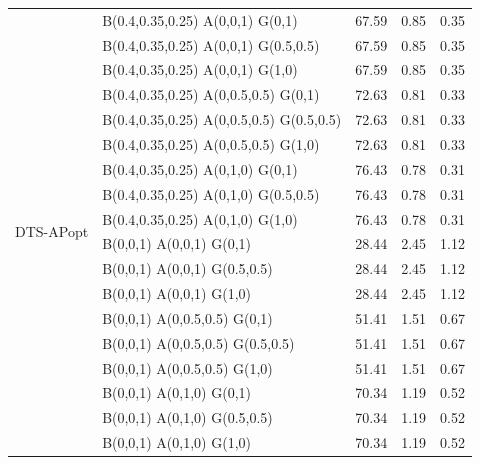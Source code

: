 \documentclass[12pt]{article}
\begin{document}
\begin{longtable}{llccc}
\multirow{18}{*}{DTS-APopt}
& B(0.4,0.35,0.25) A(0,0,1) G(0,1) & 67.59 & 0.85 & 0.35 \\
& B(0.4,0.35,0.25) A(0,0,1) G(0.5,0.5) & 67.59 & 0.85 & 0.35 \\
& B(0.4,0.35,0.25) A(0,0,1) G(1,0) & 67.59 & 0.85 & 0.35 \\
& B(0.4,0.35,0.25) A(0,0.5,0.5) G(0,1) & 72.63 & 0.81 & 0.33 \\
& B(0.4,0.35,0.25) A(0,0.5,0.5) G(0.5,0.5) & 72.63 & 0.81 & 0.33 \\
& B(0.4,0.35,0.25) A(0,0.5,0.5) G(1,0) & 72.63 & 0.81 & 0.33 \\
& B(0.4,0.35,0.25) A(0,1,0) G(0,1) & 76.43 & 0.78 & 0.31 \\
& B(0.4,0.35,0.25) A(0,1,0) G(0.5,0.5) & 76.43 & 0.78 & 0.31 \\
& B(0.4,0.35,0.25) A(0,1,0) G(1,0) & 76.43 & 0.78 & 0.31 \\
& B(0,0,1) A(0,0,1) G(0,1) & 28.44 & 2.45 & 1.12 \\
& B(0,0,1) A(0,0,1) G(0.5,0.5) & 28.44 & 2.45 & 1.12 \\
& B(0,0,1) A(0,0,1) G(1,0) & 28.44 & 2.45 & 1.12 \\
& B(0,0,1) A(0,0.5,0.5) G(0,1) & 51.41 & 1.51 & 0.67 \\
& B(0,0,1) A(0,0.5,0.5) G(0.5,0.5) & 51.41 & 1.51 & 0.67 \\
& B(0,0,1) A(0,0.5,0.5) G(1,0) & 51.41 & 1.51 & 0.67 \\
& B(0,0,1) A(0,1,0) G(0,1) & 70.34 & 1.19 & 0.52 \\
& B(0,0,1) A(0,1,0) G(0.5,0.5) & 70.34 & 1.19 & 0.52 \\
& B(0,0,1) A(0,1,0) G(1,0) & 70.34 & 1.19 & 0.52 \\
\end{longtable}
\end{document}
